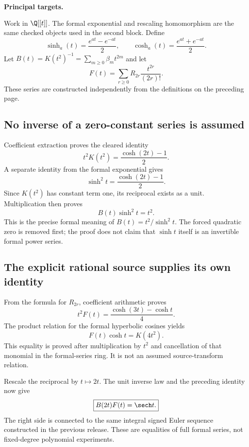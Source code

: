 \textbf{Principal targets.}\par
{}\par
{}
\par\medskip
{}
Work in $\Q[[t]]$. The formal exponential and rescaling homomorphism are the same checked objects used in the second block. Define
\[
 \sinh_a(t)=\frac{e^{at}-e^{-at}}2,\qquad
 \cosh_a(t)=\frac{e^{at}+e^{-at}}2.
\]
Let $B(t)=K(t^2)^{-1}=\sum_{m\geq0}\beta_mt^{2m}$ and let
\[
 F(t)=\sum_{r\geq0}R_{2r}\frac{t^{2r}}{(2r)!}.
\]
These series are constructed independently from the definitions on the preceding page.

\subsection*{No inverse of a zero-constant series is assumed}
Coefficient extraction proves the cleared identity
\[
 t^2K(t^2)=\frac{\cosh(2t)-1}{2}.
\]
A separate identity from the formal exponential gives
\[
 \sinh^2t=\frac{\cosh(2t)-1}{2}.
\]
Since $K(t^2)$ has constant term one, its reciprocal exists as a unit. Multiplication then proves
\[
 \boxed{B(t)\sinh^2t=t^2.}
\]
This is the precise formal meaning of $B(t)=t^2/\sinh^2t$. The forced quadratic zero is removed first; the proof does not claim that $\sinh t$ itself is an invertible formal power series.

\subsection*{The explicit rational source supplies its own identity}
From the formula for $R_{2r}$, coefficient arithmetic proves
\[
 \boxed{t^2 F(t)=\frac{\cosh(3t)-\cosh t}{4}.}
\]
The product relation for the formal hyperbolic cosines yields
\[
 F(t)\cosh t=K(4t^2).
\]
This equality is proved after multiplication by $t^2$ and cancellation of that monomial in the formal-series ring. It is not an assumed source-transform relation.

Rescale the reciprocal by $t\mapsto2t$. The unit inverse law and the preceding identity now give
\[
 \boxed{B(2t)F(t)=\sech t.}
\]
The right side is connected to the same integral signed Euler sequence constructed in the previous release. These are equalities of full formal series, not fixed-degree polynomial experiments.

